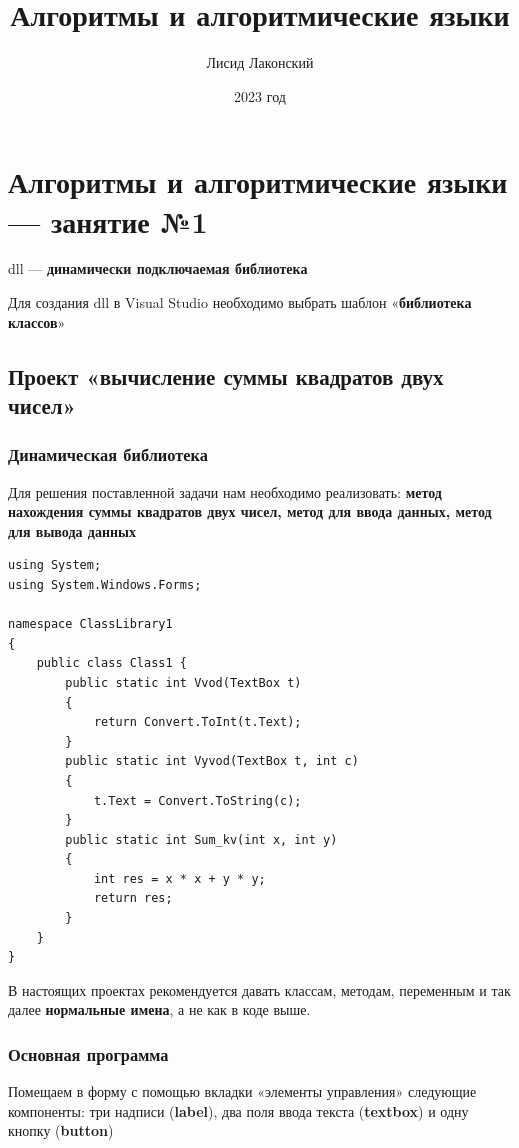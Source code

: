 \documentclass{article}
\title{Алгоритмы и алгоритмические языки}
\author{Лисид Лаконский}
\date{2023 год}
\begin{document}
\raggedright

\maketitle
\tableofcontents
\pagebreak

\section{Алгоритмы и алгоритмические языки — занятие №1}

dll — \textbf{динамически подключаемая библиотека}

Для создания dll в Visual Studio необходимо выбрать шаблон «\textbf{библиотека классов}»

\subsection{Проект «вычисление суммы квадратов двух чисел»}

\subsubsection{Динамическая библиотека}

Для решения поставленной задачи нам необходимо реализовать: \textbf{метод нахождения суммы квадратов двух чисел, метод для ввода данных, метод для вывода данных}

\begin{verbatim}
using System;
using System.Windows.Forms;

namespace ClassLibrary1
{
    public class Class1 {
        public static int Vvod(TextBox t)
        {
            return Convert.ToInt(t.Text);
        }
        public static int Vyvod(TextBox t, int c)
        {
            t.Text = Convert.ToString(c);
        }
        public static int Sum_kv(int x, int y)
        {
            int res = x * x + y * y;
            return res;
        }
    }
}
\end{verbatim}

В настоящих проектах рекомендуется давать классам, методам, переменным и так далее \textbf{нормальные имена}, а не как в коде выше.

\subsubsection{Основная программа}

Помещаем в форму с помощью вкладки «элементы управления» следующие компоненты: три надписи (\textbf{label}), два поля ввода текста (\textbf{textbox}) и одну кнопку (\textbf{button})
\end{document}
